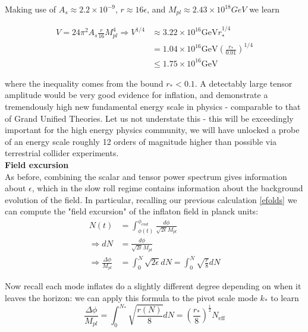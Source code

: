 \documentclass[a4paper,10pt]{article}
\newcommand{\Mp}{M_{pl}}
\newcommand{\half}{\frac{1}{2}}
\begin{document}
Making use of $ A_s \approx 2.2\times10^{-9}$, $r\approx 16\epsilon$, and $\Mp \approx 2.43\times 10^{18} GeV$ we learn

\begin{equation}\begin{split}
V=24\pi^2A_s\frac{r}{16}\Mp^4 \Rightarrow V^{1/4} &\approx 3.22\times10^{16}\text{GeV}r_*^{1/4}\\
&= 1.04\times10^{16}\text{GeV}(\frac{r_*}{0.01})^{1/4} \\
&\leq 1.75\times10^{16}\text{GeV}
\end{split}\end{equation}

where the inequality comes from the  bound $r_*<0.1$. A detectably large tensor amplitude would be very good evidence for inflation, and demonstrate a tremendously high new fundamental energy scale in physics - comparable to that of Grand Unified Theories. Let us not understate this - this will be exceedingly important for the high energy physics community, we will have unlocked a probe of an energy scale roughly 12 orders of magnitude higher than possible via terrestrial collider experiments. \\

\textbf{Field excursion}\\

As before, combining the scalar and tensor power spectrum gives information about $\epsilon$, which in the slow roll regime contains information about the background evolution of the field. In particular, recalling our previous calculation \ref{efolds} we can compute the "field excursion" of the inflaton field in planck units:
\begin{equation}\begin{split}
N(t) &=  \int_{\phi(t)}^{\phi_{end}} \frac{d\phi}{\sqrt{2\epsilon}\Mp}\\
\Rightarrow dN&=\frac{d\phi}{\sqrt{2\epsilon}\Mp}\\
\Rightarrow \frac{\Delta \phi}{\Mp} &= \int_0^N \sqrt{2\epsilon} dN = \int_0^N \sqrt{\frac{r}{8}} dN 
\end{split}\end{equation}

Now recall each mode inflates do a slightly different degree depending on when it leaves the horizon: we can apply this formula to the pivot scale mode $k_*$ to learn 
\begin{equation}
\frac{\Delta \phi}{\Mp} =  \int_0^{N_*} \sqrt{\frac{r(N)}{8}} dN  = \left(\frac{r_*}{8}\right)^\half N_{\text{eff}}
\end{equation}
\end{document}

